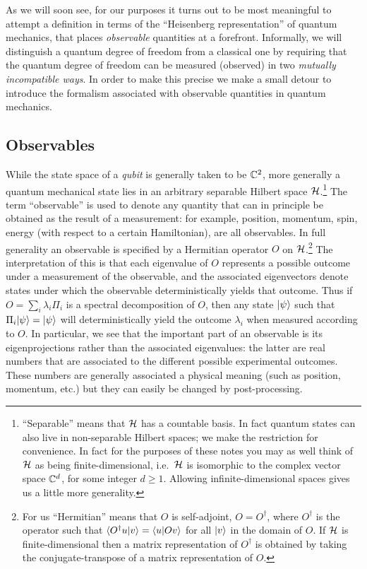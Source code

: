 As we will soon see, for our purposes it turns out to be most meaningful to attempt a definition in terms of the ``Heisenberg representation'' of quantum mechanics, that places \emph{observable} quantities at a forefront. Informally, we will distinguish a quantum degree of freedom from a classical one by requiring that the quantum degree of freedom can be measured (observed) in two \emph{mutually incompatible ways}.  In order to make this precise we make a small detour to introduce the formalism associated with observable quantities in quantum mechanics. 

\subsection{Observables}

While the state space of a \emph{qubit} is generally taken to be $\mathbb{C}^2$, more generally a quantum mechanical state lies in an arbitrary separable Hilbert space $\mathcal{H}$.\footnote{``Separable''  means that $\mathcal{H}$ has a countable basis. In fact quantum states can also live in non-separable Hilbert spaces; we make the restriction for convenience. In fact for the purposes of these notes you may as well think of $\mathcal{H}$ as being finite-dimensional, i.e.\ $\mathcal{H}$ is isomorphic to the complex vector space $\mathbb{C}^d$, for some integer $d\geq 1$. Allowing infinite-dimensional spaces gives us a little more generality.} 
The term ``observable'' is used to denote any quantity that can in principle be obtained as the result of a measurement: for example, position, momentum, spin, energy (with respect to a certain Hamiltonian), are all observables. In full generality an observable is specified by 
 a Hermitian operator $O$ on $\mathcal{H}$.\footnote{For us ``Hermitian'' means that $O$ is self-adjoint, $O=O^\dagger$, where $O^\dagger$ is the operator such that $\langle O^\dagger u|v\rangle = \langle u|Ov\rangle$ for all $|v\rangle$ in the domain of $O$. If $\mathcal{H}$ is finite-dimensional then a matrix representation of $O^\dagger$ is obtained by taking the conjugate-transpose of a matrix representation of $O$.}
 The interpretation of this is that each eigenvalue of $O$ represents a possible outcome under a measurement of the observable, and  the associated eigenvectors denote states under which the observable deterministically yields that outcome. Thus if $O = \sum_i \lambda_i \Pi_i$ is a spectral decomposition of $O$, then any state $|\psi\rangle$ such that $\Pi_i |\psi\rangle = |\psi\rangle$ will deterministically yield the outcome $\lambda_i$ when measured according to $O$. In particular, we see that the important part of an observable is its eigenprojections rather than the associated eigenvalues: the latter are real numbers that are associated to the different possible experimental outcomes. These numbers are generally associated a physical meaning (such as position, momentum, etc.) but they can easily be changed by post-processing. 

